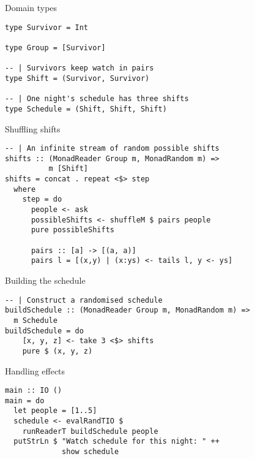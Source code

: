 \begin{frame}[fragile]{Domain types}
  \begin{block}{}
  \begin{verbatim}
type Survivor = Int

type Group = [Survivor]

-- | Survivors keep watch in pairs
type Shift = (Survivor, Survivor)

-- | One night's schedule has three shifts
type Schedule = (Shift, Shift, Shift)
  \end{verbatim}
  \end{block}
\end{frame}

\begin{frame}[fragile]{Shuffling shifts}
  \begin{block}{}
  \begin{verbatim}
-- | An infinite stream of random possible shifts
shifts :: (MonadReader Group m, MonadRandom m) =>
          m [Shift]
shifts = concat . repeat <$> step
  where
    step = do
      people <- ask
      possibleShifts <- shuffleM $ pairs people
      pure possibleShifts

      pairs :: [a] -> [(a, a)]
      pairs l = [(x,y) | (x:ys) <- tails l, y <- ys]
  \end{verbatim}
  \end{block}
\end{frame}

\begin{frame}[fragile]{Building the schedule}
  \begin{block}{}
  \begin{verbatim}
-- | Construct a randomised schedule
buildSchedule :: (MonadReader Group m, MonadRandom m) =>
  m Schedule
buildSchedule = do
    [x, y, z] <- take 3 <$> shifts
    pure $ (x, y, z)
  \end{verbatim}
  \end{block}
\end{frame}

\begin{frame}[fragile]{Handling effects}
  \begin{block}{}
  \begin{verbatim}
main :: IO ()
main = do
  let people = [1..5]
  schedule <- evalRandTIO $
    runReaderT buildSchedule people
  putStrLn $ "Watch schedule for this night: " ++
             show schedule
  \end{verbatim}
  \end{block}
\end{frame}

